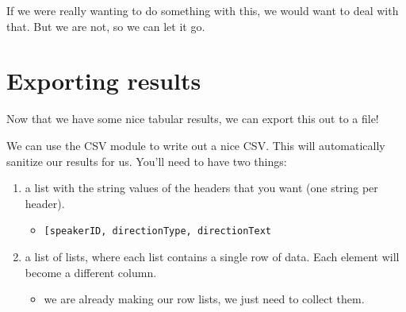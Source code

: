 \documentclass[11pt]{article}
\providecommand{\tightlist}{%
      \setlength{\itemsep}{0pt}\setlength{\parskip}{0pt}}
\begin{document}
    If we were really wanting to do something with this, we would want to
deal with that. But we are not, so we can let it go.

    \section{Exporting results}\label{exporting-results}

Now that we have some nice tabular results, we can export this out to a
file!

We can use the CSV module to write out a nice CSV. This will
automatically sanitize our results for us. You'll need to have two
things:

\begin{enumerate}
\def\labelenumi{\arabic{enumi}.}
\tightlist
\item
  a list with the string values of the headers that you want (one string
  per header).

  \begin{itemize}
  \tightlist
  \item
    \texttt{{[}\textquotesingle{}speakerID\textquotesingle{},\ \textquotesingle{}directionType\textquotesingle{},\ \textquotesingle{}directionText\textquotesingle{}{]}}
  \end{itemize}
\item
  a list of lists, where each list contains a single row of data. Each
  element will become a different column.

  \begin{itemize}
  \tightlist
  \item
    we are already making our row lists, we just need to collect them.
  \end{itemize}
\end{enumerate}
\end{document}
